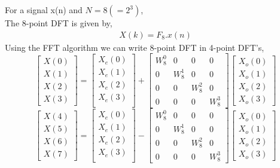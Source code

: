 \documentclass[journal,12pt,twocolumn]{IEEEtran}
\renewcommand\thesection{\arabic{section}}
\begin{document}
\begin{enumerate}[label=\thesection.\arabic*.,ref=\thesection.\theenumi]
For a signal x(n) and $N=8(=2^{3})$,\\
The 8-point DFT is given by,
\begin{align}
  X(k) = F_{8}.x(n)
\end{align}
Using the FFT algorithm we can write 8-point DFT in 4-point DFT's,
\begin{equation}
\begin{bmatrix}
X(0) \\ 
X(1) \\ 
X(2) \\ 
X(3)
\end{bmatrix}
=
\begin{bmatrix}
X_{e}(0) \\ 
X_{e}(1)\\ 
X_{e}(2)\\
X_{e}(3)\\
\end{bmatrix}
+
\begin{bmatrix}
W^{0}_{8} & 0 & 0 & 0\\
0 & W^{1}_{8} & 0 & 0\\
0 & 0 & W^{2}_{8} & 0\\
0 & 0 & 0 & W^{3}_{8}
\end{bmatrix}
\begin{bmatrix}
X_{o}(0) \\ 
X_{o}(1) \\ 
X_{o}(2) \\
X_{o}(3)
\end{bmatrix}
\end{equation}
\begin{equation}
\begin{bmatrix}
X(4) \\ 
X(5) \\ 
X(6) \\ 
X(7)
\end{bmatrix}
=
\begin{bmatrix}
X_{e}(0) \\ 
X_{e}(1)\\ 
X_{e}(2)\\
X_{e}(3)\\
\end{bmatrix}
-
\begin{bmatrix}
W^{0}_{8} & 0 & 0 & 0\\
0 & W^{1}_{8} & 0 & 0\\
0 & 0 & W^{2}_{8} & 0\\
0 & 0 & 0 & W^{3}_{8}
\end{bmatrix}
\begin{bmatrix}
X_{o}(0) \\ 
X_{o}(1) \\ 
X_{o}(2) \\
X_{o}(3)
\end{bmatrix}
\end{equation}


\end{enumerate}
\end{document}
